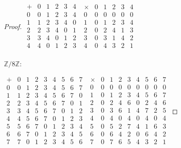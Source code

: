 \documentclass[11pt,a4paper]{article}
\newcommand{\Z}{\mathbb{Z}}
\begin{document}
{\begin{proof}
\medskip

$
\begin{array}{c|ccccc}
+ & 0 & 1 & 2 & 3 & 4\\ \hline
0 & 0 & 1 & 2 & 3 & 4\\
1 & 1 & 2 & 3 & 4 & 0\\
2 & 2 & 3 & 4 & 0 & 1\\
3 & 3 & 4 & 0 & 1 & 2\\
4 & 4 & 0 & 1 & 2 & 3\\
\end{array}
$
\qquad
$
\begin{array}{c|ccccc}
\times & 0 & 1 & 2 & 3 & 4\\ \hline
0 & 0 & 0 & 0 & 0 & 0\\
1 & 0 & 1 & 2 & 3 & 4\\
2 & 0 & 2 & 4 & 1 & 3\\
3 & 0 & 3 & 1 & 4 & 2\\
4 & 0 & 4 & 3 & 2 & 1\\
\end{array}
$

\bigskip

$\Z/8\Z$:

\medskip

$
\begin{array}{c|cccccccc}
+ & 0 & 1 & 2 & 3 & 4 & 5 & 6 & 7\\ \hline
0 & 0 & 1 & 2 & 3 & 4 & 5 & 6 & 7\\
1 & 1 & 2 & 3 & 4 & 5 & 6 & 7 & 0\\
2 & 2 & 3 & 4 & 5 & 6 & 7 & 0 & 1\\
3 & 3 & 4 & 5 & 6 & 7 & 0 & 1 & 2\\
4 & 4 & 5 & 6 & 7 & 0 & 1 & 2 & 3\\
5 & 5 & 6 & 7 & 0 & 1 & 2 & 3 & 4\\
6 & 6 & 7 & 0 & 1 & 2 & 3 & 4 & 5\\
7 & 7 & 0 & 1 & 2 & 3 & 4 & 5 & 6\\
\end{array}
$
\qquad
$
\begin{array}{c|cccccccc}
\times & 0 & 1 & 2 & 3 & 4 & 5 & 6 & 7\\ \hline
0 & 0 & 0 & 0 & 0 & 0 & 0 & 0 & 0\\
1 & 0 & 1 & 2 & 3 & 4 & 5 & 6 & 7\\
2 & 0 & 2 & 4 & 6 & 0 & 2 & 4 & 6\\
3 & 0 & 3 & 6 & 1 & 4 & 7 & 2 & 5\\
4 & 0 & 4 & 0 & 4 & 0 & 4 & 0 & 4\\
5 & 0 & 5 & 2 & 7 & 4 & 1 & 6 & 3\\
6 & 0 & 6 & 4 & 2 & 0 & 6 & 4 & 2\\
7 & 0 & 7 & 6 & 5 & 4 & 3 & 2 & 1\\
\end{array}
$
\bigskip


\end{proof}}
\end{document}
